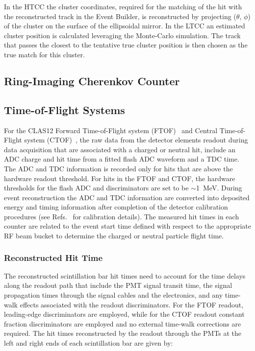 \documentclass[3p,times,twocolumn]{elsarticle}
\begin{document}
In the HTCC the cluster coordinates, required for the matching of the hit with the reconstructed track in the Event Builder, is
reconstructed by projecting  ($\theta$, $\phi$) of the cluster on the surface of the ellipsoidal mirror.     In the LTCC an estimated cluster
position is calculated leveraging the Monte-Carlo simulation.  The track that passes the closest to the tentative true cluster position is then chosen as the true match for this cluster.

\subsection{Ring-Imaging Cherenkov Counter}

\subsection{Time-of-Flight Systems}

For the CLAS12 Forward Time-of-Flight system (FTOF)~\cite{ftof-nim} and Central Time-of-Flight system
(CTOF)~\cite{ctof-nim}, the raw data from the detector elements readout during data acquisition that are
associated with a charged or neutral hit, include an ADC charge and hit time from a fitted flash ADC waveform
and a TDC time. The ADC and TDC information is recorded only for hits that are above the hardware readout
threshold. For hits in the FTOF and CTOF, the hardware thresholds for the flash ADC and discriminators are set
to be $\sim$1~MeV. During event reconstruction the ADC and TDC information are converted into deposited energy
and timing information after completion of the detector calibration procedures (see Refs.~\cite{ftof-nim,ctof-nim}
for calibration details). The measured hit times in each counter are related to the event start time defined with
respect to the appropriate RF beam bucket to determine the charged or neutral particle flight time.

\subsubsection{Reconstructed Hit Time}
\label{rec:time}

The reconstructed scintillation bar hit times need to account for the time delays along the readout path that
include the PMT signal transit time, the signal propagation times through the signal cables and the electronics,
and any time-walk effects associated with the readout discriminators. For the FTOF readout, leading-edge
discriminators are employed, while for the CTOF readout constant fraction discriminators are employed and no
external time-walk corrections are required. The hit times reconstructed by the readout through the PMTs at
the left and right ends of each scintillation bar are given by:
\end{document}
